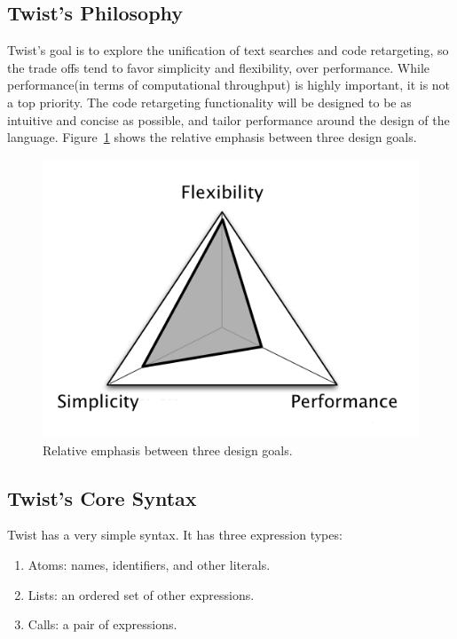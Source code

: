 \subsection{Twist's Philosophy}
\label{sec:philosophy}

Twist's goal is to explore the unification of text searches and code retargeting, so the trade offs tend to favor simplicity and flexibility, over performance. While performance(in terms of computational throughput) is highly important, it is not a top priority. The code retargeting functionality will be designed to be as intuitive and concise as possible, and tailor performance around the design of the language. Figure~\ref{fig:focalpoints} shows the relative emphasis between three design goals.

\begin{figure}[!ht]
    \centering
    \includegraphics[width=\textwidth]{images/focalpoints}
    \caption{Relative emphasis between three design goals.}
    \label{fig:focalpoints}
\end{figure}

\subsection{Twist's Core Syntax}
\label{sec:syntax}

Twist has a very simple syntax. It has three expression types: 

\begin{enumerate}
	\item Atoms: names, identifiers, and other literals.
	\item Lists: an ordered set of other expressions. 
	\item Calls: a pair of expressions.
\end{enumerate}

